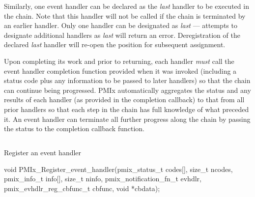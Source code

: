 Similarly, one event handler can be declared as the \textit{last} handler to be executed in the chain. Note that this handler will not be called if the chain is terminated by an earlier handler. Only one handler can be designated as \textit{last} --- attempts to designate additional handlers as \textit{last} will return an error. Deregistration of the declared \textit{last} handler will re-open the position for subsequent assignment.

Upon completing its work and prior to returning, each handler \textit{must} call the event handler completion function provided when it was invoked (including a status code plus any information to be passed to later handlers) so that the chain can continue being progressed. \ac{PMIx} automatically aggregates the status and any results of each handler (as provided in the completion callback) to that from all prior handlers so that each step in the chain has full knowledge of what preceded it. An event handler can terminate all further progress along the chain by passing the  status to the completion callback function.


\subsection{}

\summary

Register an event handler

\format

\cspecificstart
\begin{codepar}
void
PMIx_Register_event_handler(pmix_status_t codes[], size_t ncodes,
                            pmix_info_t info[], size_t ninfo,
                            pmix_notification_fn_t evhdlr,
                            pmix_evhdlr_reg_cbfunc_t cbfunc,
                            void *cbdata);
\end{codepar}
\cspecificend

\begin{arglist}
\end{arglist}



